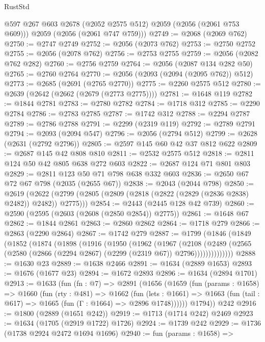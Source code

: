 \begin{lexlean}{RustStd}
\begin{coremodule}
        @597
        @267
        @603
        @2678
        (@2052 @2575 @512)
        @2059
        (@2056 (@2061 @753 @609)))
      @2059
      (@2056 (@2061 @747 @759)))
@2749 := @2068 (@2069 @762)
@2750 := @2747 @2749
@2752 := @2056 (@2073 @762)
@2753 := @2750 @2752
@2755 := @2056 (@2078 @762)
@2756 := @2753 @2755
@2759 := @2056 (@2082 @762 @282)
@2760 := @2756 @2759
@2764 := @2056 (@2087 @134 @282 @50)
@2765 := @2760 @2764
@2770 := @2056 (@2093 (@2094 (@2095 @762)) @512)
@2773 := @2685 (@2691 (@2765 @2770))
@2775 := @2260 @2575 @512
@2780 := @2639 (@2642 (@2662 (@2679 (@2773 @2775))))
@2781 := @1648 @119
@2782 := @1844 @2781
@2783 := @2780 @2782
@2784 := @1718 @312
@2785 := @2290 @2784
@2786 := @2783 @2785
@2787 := @1742 @312
@2788 := @2294 @2787
@2789 := @2786 @2788
@2791 := @2299 (@2319 @119)
@2792 := @2789 @2791
@2794 := @2093 (@2094 @547)
@2796 := @2056 (@2794 @512)
@2799 := @2628 (@2631 (@2792 @2796))
@2805 := @2597 @145 @60 @42 @37 @812 @622
@2809 := @2687 @145 @42 @808 @810
@2811 := @2532 @2575 @512
@2818 := @2811 @124 @50 @42 @805 @638 @272 @603
@2822 := @2687 @124 @71 @801 @803
@2829 := @2811 @123 @50 @71 @798 @638 @332 @603
@2836 := @2650 @67 @72 @67 @798 (@2035 (@2655 @67))
@2838 := @2043 (@2044 @798)
@2850 := @2619
    (@2622 (@2799 (@2805 (@2809 (@2818 (@2822 (@2829 (@2836 @2838) @2482)) @2482)) @2775)))
@2854 := @2443 (@2445 @128 @42 @739)
@2860 := @2590 (@2595 (@2603 (@2608 (@2850 @2854)) @2775))
@2861 := @1648 @67
@2862 := @1844 @2861
@2863 := @2860 @2862
@2864 := @1718 @279
@2866 := @2863 (@2290 @2864)
@2867 := @1742 @279
@2887 := @1799
    (@1846
      (@1849
        (@1852
          (@1874
            (@1898
              (@1916
                (@1950
                  (@1962
                    (@1967
                      (@2108
                        (@2489
                          (@2565 (@2580 (@2866 (@2294 @2867) (@2299 (@2319 @67)) @2796))))))))))))))
@2888 := @1630 @23
@2889 := @1638 @2466
@2891 := @1634 (@2889 @1653)
@2893 := @1676 (@1677 @23)
@2894 := @1672 @2893
@2896 := @1634 (@2894 @1701)
@2913 := @1633
    (fun (fn : @7) =>
    @2891
      (@1656
        (@1659
          (fun (params : @1658) =>
          @1660
            (fun (rty : @481) =>
            @1662
              (fun (lets : @1661) =>
              @1663 (fun (tail : @617) => @1665 (fun (Γ : @1664) => @2896 @1748))))))
        @1794))
    @242
@2916 := @1800 (@2889 (@1651 @242))
@2919 := @1713 (@1714 @242) @2469
@2923 := @1634 (@1705 (@2919 @1722) @1726)
@2924 := @1739 @242
@2929 := @1736 (@1738 @2924 @2472 @1694 @1696)
@2940 := fun (params : @1658) =>

\end{coremodule}
\end{lexlean}
